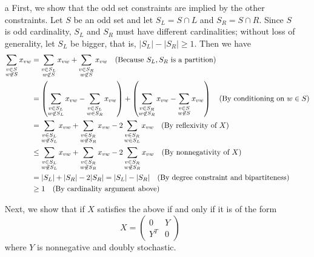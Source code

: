 \documentclass{hmcpset}
\begin{document}
\begin{solution}
\begin{enumerate}
\item[a] 
First, we show that the odd set constraints are implied by the other constraints. Let $S$ be an odd set and let $S_L = S \cap L$ and $S_R = S \cap R$. Since $S$ is odd cardinality, $S_L$ and $S_R$ must have different cardinalities; without loss of generality, let $S_L$ be bigger, that is, $|S_L| - |S_R| \geq 1$. Then we have
\begin{align*}
\sum_{\substack{v \in S \\ w \not \in S}} x_{vw} &= \sum_{\substack{v \in S_L \\ w \not \in S}} x_{vw} + \sum_{\substack{v \in S_R \\ w \not \in S}} x_{vw} \text{\quad(Because $S_L,S_R$ is a partition)} \\
&= \left (\sum_{\substack{v \in S_L \\ w \not \in S_L}} x_{vw} - \sum_{\substack{v \in S_L \\ w \in S_R}} x_{vw}\right ) + \left (\sum_{\substack{v \in S_R \\ w \not \in S_R}} x_{vw} - \sum_{\substack{v \in S \\ w \not \in S}} x_{vw}\right ) \text{\quad (By conditioning on $w\in S$)} \\
&= \sum_{\substack{v \in S_L \\ w \not \in S_L}} x_{vw} + \sum_{\substack{v \in S_R \\ w \not \in S_R}} x_{vw} - 2\sum_{\substack{v \in S_R \\ w \in S_L}} x_{vw} \text{\quad (By reflexivity of $X$)}\\
&\leq \sum_{\substack{v \in S_L \\ w \not \in S_L}} x_{vw} + \sum_{\substack{v \in S_R \\ w \not \in S_R}} x_{vw} - 2\sum_{\substack{v \in S_R \\ w \not \in S_R}} x_{vw} \text {\quad (By nonnegativity of $X$)}\\
& = |S_L| + |S_R| - 2|S_R| = |S_L|-|S_R| \text{\quad (By degree constraint and bipartiteness)}\\
& \geq 1 \text {\quad (By cardinality argument above)}
\end{align*}

Next, we show that if $X$ satisfies the above if and only if it is of the form 
\[ X = \begin{pmatrix} 0 & Y \\ Y^T & 0\end{pmatrix} \]
where $Y$ is nonnegative and doubly stochastic.


\end{enumerate}
\end{solution}
\end{document}
